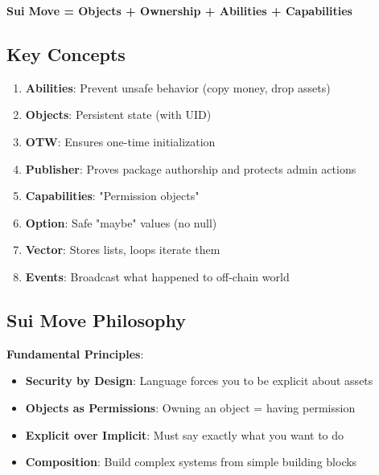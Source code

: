 \documentclass[11pt]{article}
\begin{document}
\begin{center}
\Large\textbf{Sui Move = Objects + Ownership + Abilities + Capabilities}
\end{center}

\subsection{Key Concepts}

\begin{enumerate}
  \item \textbf{Abilities}: Prevent unsafe behavior (copy money, drop assets)
  \item \textbf{Objects}: Persistent state (with UID)
  \item \textbf{OTW}: Ensures one-time initialization
  \item \textbf{Publisher}: Proves package authorship and protects admin actions
  \item \textbf{Capabilities}: "Permission objects"
  \item \textbf{Option}: Safe "maybe" values (no null)
  \item \textbf{Vector}: Stores lists, loops iterate them
  \item \textbf{Events}: Broadcast what happened to off-chain world
\end{enumerate}

\subsection{Sui Move Philosophy}

\begin{noteBox}
\textbf{Fundamental Principles}:
\begin{itemize}
  \item \textbf{Security by Design}: Language forces you to be explicit about assets
  \item \textbf{Objects as Permissions}: Owning an object = having permission
  \item \textbf{Explicit over Implicit}: Must say exactly what you want to do
  \item \textbf{Composition}: Build complex systems from simple building blocks
\end{itemize}
\end{noteBox}
\end{document}
